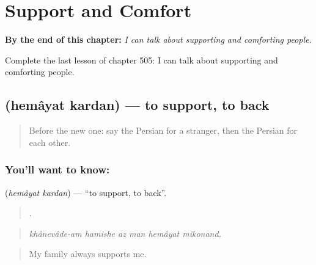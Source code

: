 
\chapter{Support and Comfort}
\label{ch:fa-support-and-comfort}

\begin{chapteropening}
\textbf{By the end of this chapter:} \emph{I can talk about supporting and comforting people.}

Complete the last lesson of chapter 505: I can talk about supporting and comforting people.
\end{chapteropening}

\section[\texorpdfstring{\fa{حمایت} \fa{کردن} (hemâyat kardan)}{حمایت کردن (hemâyat kardan)}]{  (hemâyat kardan) — to support, to back}

\label{lesson:FA-C505-hemayat-kardan}



\begin{quote}
Before the new one: say the Persian for a stranger, then the Persian for each other.
\end{quote}

\subsection*{You'll want to know:  }
\textbf{ } (\emph{hemâyat kardan}) — \textquotedblleft{}to support, to back\textquotedblright{}.

\begin{quote}
      .
\end{quote}

\begin{quote}
\emph{khânevâde-am hamishe az man hemâyat mikonand.}
\end{quote}

\begin{quote}
My family always supports me.
\end{quote}

